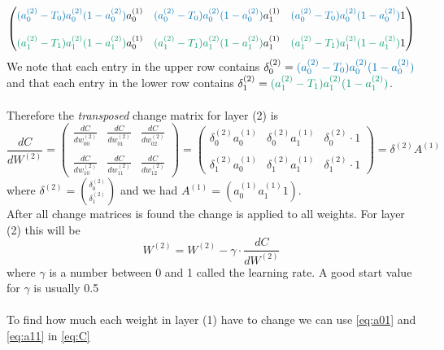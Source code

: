 \documentclass{article}
\begin{document}
$$\begin{pmatrix}
\textcolor{darkblue}{(a_0^{(2)}-T_0)a_0^{(2)}(1-a_0^{(2)})}a_0^{(1)} & \textcolor{darkblue}{(a_0^{(2)}-T_0)a_0^{(2)}(1-a_0^{(2)})}a_1^{(1)} & \textcolor{darkblue}{(a_0^{(2)}-T_0)a_0^{(2)}(1-a_0^{(2)})}1
\\\\
\textcolor{green}{(a_1^{(2)}-T_1)a_1^{(2)}(1-a_1^{(2)})}a_0^{(1)} & \textcolor{green}{(a_1^{(2)}-T_1)a_1^{(2)}(1-a_1^{(2)})}a_1^{(1)} & \textcolor{green}{(a_1^{(2)}-T_1)a_1^{(2)}(1-a_1^{(2)})}1
\end{pmatrix}$$
We note that each entry in the upper row contains $\delta_0^{(2)} = \textcolor{darkblue}{(a_0^{(2)}-T_0)a_0^{(2)}(1-a_0^{(2)})}$ and that each entry in the lower row contains $\delta_1^{(2)} = \textcolor{green}{(a_1^{(2)}-T_1)a_1^{(2)}(1-a_1^{(2)})}$.
\\
\\
Therefore the \textit{transposed} change matrix for layer (2) is $$\frac{dC}{dW^{(2)}} =
\begin{pmatrix}
\frac{dC}{dw_{00}^{(2)}} & \frac{dC}{dw_{01}^{(2)}} & \frac{dC}{dw_{02}^{(2)}}
\\\\
\frac{dC}{dw_{10}^{(2)}} & \frac{dC}{dw_{11}^{(2)}} & \frac{dC}{dw_{12}^{(2)}}
\end{pmatrix} = \begin{pmatrix}
\delta_0^{(2)}a_0^{(1)} & \delta_0^{(2)}a_1^{(1)} & \delta_0^{(2)} \cdot 1
\\\\
\delta_1^{(2)}a_0^{(1)} & \delta_1^{(2)}a_1^{(1)} & \delta_1^{(2)} \cdot 1
\end{pmatrix} = \delta^{(2)}A^{(1)}
$$
where $\delta^{(2)} = \binom{\delta_0^{(2)}}{\delta_1^{(2)}}$
and we had $A^{(1)} = (a_0^{(1)} a_1^{(1)} 1)$.
\\
After all change matrices is found the change is applied to all weights. For layer (2) this will be $$W^{(2)} = W^{(2)} - \gamma \cdot \frac{dC}{dW^{(2)}}$$
where $\gamma$ is a number between 0 and 1 called the learning rate. A good start value for $\gamma$ is usually 0.5
\\
\\
To find how much each weight in layer (1) have to change we can use \textcolor{green}{\eqref{eq:a01}} and \textcolor{darkblue}{\eqref{eq:a11}} in \eqref{eq:C}
\end{document}
